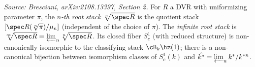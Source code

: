 \begin{definition}[InfRootStack]
  \label{def:infinite-root-stack}
  \textit{Source: Bresciani, arXiv:2108.13397, Section 2.}
  For \(R\) a DVR with uniformizing parameter \(\pi\), the \emph{\(n\)-th root stack}
  \(\sqrt[n]{\spec R}\) is the quotient stack \([\spec R(\sqrt[n]{\pi})/\mu_n]\)
  (independent of the choice of \(\pi\)). The \emph{infinite root stack} is
  \(\sqrt[\infty]{\spec R} = \varprojlim_n \sqrt[n]{\spec R}\). Its closed fiber
  \(S^1_c\) (with reduced structure) is non-canonically isomorphic to the classifying
  stack \(\cB_k \hz(1)\); there is a non-canonical bijection between isomorphism
  classes of \(S^1_c(k)\) and \(\hat{k^*} = \varprojlim_n k^*/k^{*n}\).
\end{definition}


